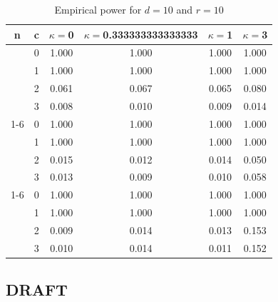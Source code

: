 \documentclass[oneside,11pt]{article}
\begin{document}
\begin{table}[H]
\centering
\caption{Empirical power for $d = 10$ and $r = 10$}
\centering
\begin{tabular}[t]{cccccc}
\toprule
n & c & $\kappa = $0 & $\kappa = $0.333333333333333 & $\kappa = $1 & $\kappa = $3\\
\midrule
 & 0 & 1.000 & 1.000 & 1.000 & 1.000\\

 & 1 & 1.000 & 1.000 & 1.000 & 1.000\\

 & 2 & 0.061 & 0.067 & 0.065 & 0.080\\

\multirow{-4}{*}{\centering\arraybackslash 10} & 3 & 0.008 & 0.010 & 0.009 & 0.014\\
\cmidrule{1-6}
 & 0 & 1.000 & 1.000 & 1.000 & 1.000\\

 & 1 & 1.000 & 1.000 & 1.000 & 1.000\\

 & 2 & 0.015 & 0.012 & 0.014 & 0.050\\

\multirow{-4}{*}{\centering\arraybackslash 50} & 3 & 0.013 & 0.009 & 0.010 & 0.058\\
\cmidrule{1-6}
 & 0 & 1.000 & 1.000 & 1.000 & 1.000\\

 & 1 & 1.000 & 1.000 & 1.000 & 1.000\\

 & 2 & 0.009 & 0.014 & 0.013 & 0.153\\

\multirow{-4}{*}{\centering\arraybackslash 100} & 3 & 0.010 & 0.014 & 0.011 & 0.152\\
\bottomrule
\end{tabular}
\end{table}

\subsection{DRAFT}
\end{document}
